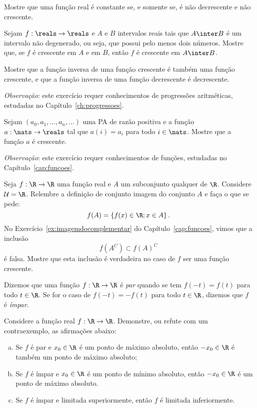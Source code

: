 \begin{exercise}
  Mostre que uma função real é constante se, e somente se, é não decrescente e não crescente.
\end{exercise}

\begin{exercise}
  Sejam $f : \reals \to \reals$ e $A$ e $B$ intervalos reais tais que $A \inter B$ é um intervalo não
  degenerado, ou seja, que possui pelo menos dois números. Mostre que, se $f$ é crescente
  em $A$ e em $B$, então $f$ é crescente em $A\inter B$.
\end{exercise}

\begin{exercise}
\label{exer:inversa-funcao-crescente}
Mostre que a função inversa de uma função crescente é também uma
função crescente, e que a função inversa de uma função decrescente é
decrescente.
\end{exercise}

\begin{exercise}
\textit{Observação}: este exercício requer conhecimentos de progressões
aritméticas, estudadas no Capítulo~\ref{ch:progressoes}.

  Sejam $(a_0,a_1, \dots,a_n,\dots)$ uma PA de razão positiva e a função 
  $a : \nats \to \reals$ tal que $a(i)=a_i$ para todo $i\in\nats$.
  Mostre que a função $a$ é crescente.
\end{exercise}

\begin{exercise}
  \textit{Observação}: este exercício requer conhecimentos de funções, estudadas no Capítulo~\ref{cap:funcoes}.
  
  Seja $f : \R \to \R$ uma função real e $A$ um subconjunto qualquer de $\R$. Considere $\mathcal U = \R$. Relembre a definição de conjunto imagem do conjunto $A$ e faça o que se pede:
  $$f(A) = \left\{ f(x) \in \R ; x \in A \right\}.$$
  No Exercício~\ref{ex:imagemdocomplementar} do Capítulo~\ref{cap:funcoes}, vimos que a inclusão $$f\left(A^C\right) \subset f(A)^C$$ 
  é falsa. Mostre que esta inclusão é verdadeira no caso de $f$ ser uma função crescente.
  \end{exercise}

\begin{exercise}
  Dizemos que uma função $f: \R \to \R$ é \emph{par} quando se tem $f(-t) = f(t)$ para todo $t \in \R$. Se for o caso de $f(-t) = -f(t)$ para todo $t \in \R$, dizemos que $f$ é \emph{ímpar}.

  Considere a função real $f: \R \to \R$. Demonstre, ou refute com um contraexemplo, as afirmações abaixo:
  \begin{enumerate}[a)]
    \item Se $f$ é par e $x_0 \in \R$ é um ponto de máximo absoluto, então $-x_0 \in \R$ é também um ponto de máximo absoluto;
    \item Se $f$ é ímpar e $x_0 \in \R$ é um ponto de mínimo absoluto, então $-x_0 \in \R$ é um ponto de máximo absoluto.
    \item Se $f$ é ímpar e limitada superiormente, então $f$ é limitada inferiormente.
  \end{enumerate}
\end{exercise}
